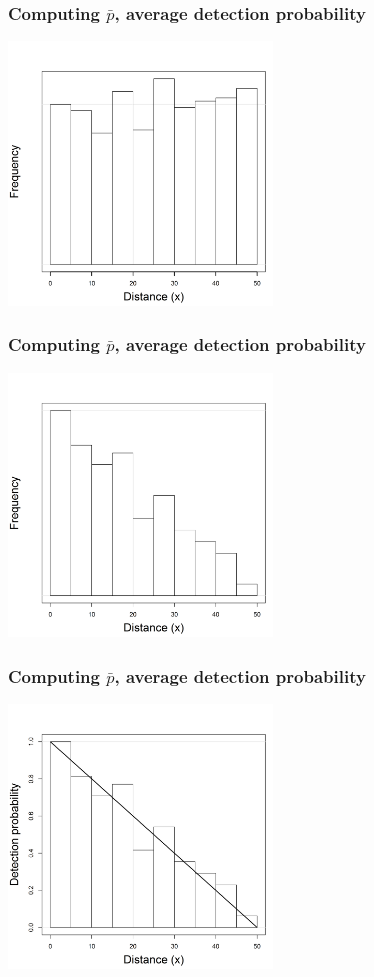 \documentclass[color=usenames,dvipsnames]{beamer}\usepackage[]{graphicx}\usepackage[]{color}
\begin{document}
\begin{frame}
  \frametitle{Computing $\bar{p}$, average detection probability}
\begin{center}
  \includegraphics[width=7cm]{figs/detfun0-0}
\end{center}
\end{frame}



\begin{frame}
  \frametitle{Computing $\bar{p}$, average detection probability}
\begin{center}
  \includegraphics[width=7cm]{figs/detfun0-1}
\end{center}
\end{frame}




\begin{frame}
  \frametitle{Computing $\bar{p}$, average detection probability}
\begin{center}
  \includegraphics[width=7cm]{figs/detfun0-2}
\end{center}
\end{frame}
\end{document}
